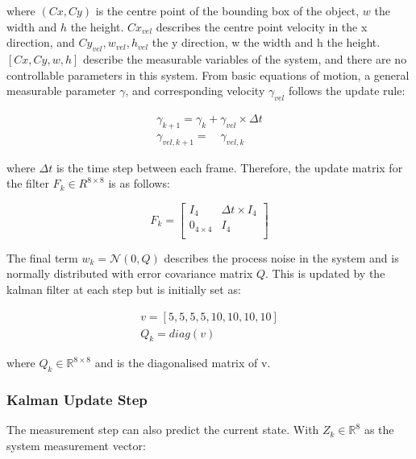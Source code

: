 \documentclass[a4paper,11pt,notitlepage]{article}
\begin{document}
where $(Cx,Cy)$ is the centre point of the bounding box of the object, $w$ the width and $h$ the height. $Cx_{vel}$ describes the centre point velocity in the x direction, and $Cy_{vel},w_{vel},h_{vel}$ the y direction, w the width and h the height. $[Cx,Cy,w,h]$ describe the measurable variables of the system, and there are no controllable parameters in this system. From basic equations of motion, a general measurable parameter $\gamma$, and corresponding velocity  $\gamma_{vel}$ follows the update rule:

\begin{equation}
\begin{aligned}
\gamma_{k+1} = \gamma_{k} + \gamma_{vel} \times \Delta t \\
\gamma_{vel,k+1} = \quad \gamma_{vel,k}
\end{aligned}
\end{equation}

where $\Delta t$ is the time step between each frame. Therefore, the update matrix for the filter $F_{k} \in R^{8 \times 8}$ is as follows:

\begin{equation}
F_{k} = 
\begin{bmatrix}
I_{4} & \Delta t \times I_{4} \\[0.3em]

0_{4 \times 4} & I_{4} \\[0.3em]
\end{bmatrix}
\end{equation}

The final term $w_{k} = \mathcal{N}(0,Q)$ describes the process noise in the system and is normally distributed with error covariance matrix $Q$. This is updated by the kalman filter at each step but is initially set as:

\begin{equation}
\begin{aligned}
v = [5,5,5,5,10,10,10,10] \\
Q_{k} = diag(v)
\end{aligned}
\end{equation}

where $Q_{k} \in \mathbb{R}^{8 \times 8}$ and is the diagonalised matrix of v. 

\subsubsection{Kalman Update Step}

The measurement step can also predict the current state. With $Z_{k} \in \mathbb{R}^{8}$ as the system measurement vector:
\end{document}
